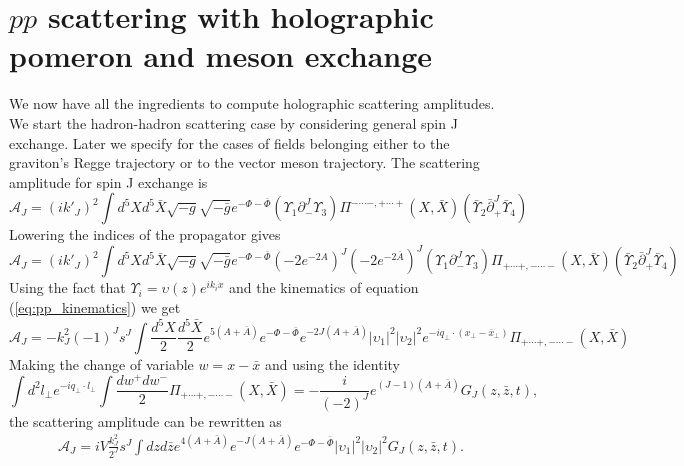 \documentclass[a4paper,12pt]{article}
\begin{document}
\section{$pp$ scattering with holographic pomeron and meson exchange}
We now have all the ingredients to compute holographic scattering amplitudes. We start the hadron-hadron scattering case by considering general spin J exchange. Later we specify for the cases of fields belonging either to the graviton's Regge trajectory or to the vector meson trajectory. The scattering amplitude for spin J exchange is
\begin{equation}
\mathcal{A}_J = {\left(i k'_J\right)}^2 \int d^5X d^5\bar{X} \sqrt{-g} \sqrt{-\bar{g}} e^{- \Phi -\bar{\Phi}} \left(\Upsilon_1 \partial_{-}^J \Upsilon_3\right) \Pi^{-\cdots-, + \cdots +} \left(X, \bar{X}\right) \left(\bar{\Upsilon}_2 \bar{\partial}_{+}^J \bar{\Upsilon}_4\right)
\end{equation}
Lowering the indices of the propagator gives
\begin{equation}
\mathcal{A}_J = {\left(i k'_J\right)}^2 \int d^5X d^5\bar{X} \sqrt{-g} \sqrt{-\bar{g}} e^{- \Phi -\bar{\Phi}} {\left(-2 e^{-2 A }\right)}^J {\left(-2 e^{-2 \bar{A} }\right)}^J \left(\Upsilon_1 \partial_{-}^J \Upsilon_3\right) \Pi_{+\cdots+, - \cdots -} \left(X, \bar{X}\right) \left(\bar{\Upsilon}_2 \bar{\partial}_{+}^J \bar{\Upsilon}_4\right)
\end{equation}
Using the fact that $\Upsilon_i = \upsilon\left(z\right) e^{i k_i \dot x}$ and the kinematics of equation (\ref{eq:pp_kinematics}) we get
\begin{equation}
\mathcal{A}_J = - k_J^2 {\left(-1\right)}^J s^J \int \frac{d^5X}{2}\frac{d^5\bar{X}}{2} e^{5\left(A+\bar{A}\right)} e^{-\Phi - \bar{\Phi}} e^{-2J\left(A+\bar{A}\right)} {|\upsilon_1|}^2 {|\upsilon_2|}^2 e^{-i q_\perp \cdot \left(x_\perp - \bar{x}_\perp\right)} \Pi_{+ \cdots +, - \cdots -} \left(X, \bar{X}\right)
\end{equation}
Making the change of variable $w = x - \bar{x}$  and using the identity
\begin{equation}
\int d^2 l_\perp e^{- i q_\perp \cdot l_\perp}\int \frac{dw^+ dw^-}{2} \Pi_{+\cdots+, - \cdots -} \left(X, \bar{X}\right) = - \frac{i}{\left(-2\right)^J} e^{\left(J-1\right)\left(A+\bar{A}\right)} G_J \left(z, \bar{z}, t\right),
\end{equation}
the scattering amplitude can be rewritten as
\begin{align}
\mathcal{A}_J = i V \frac{k_J^2}{2^J} s^J \int dz d\bar{z} e^{4\left(A+\bar{A}\right)} e^{-J\left(A+\bar{A}\right)} e^{-\Phi - \bar{\Phi}} {|\upsilon_1|}^2 {|\upsilon_2|}^2  G_J \left(z, \bar{z}, t\right).
\end{align}
\end{document}
